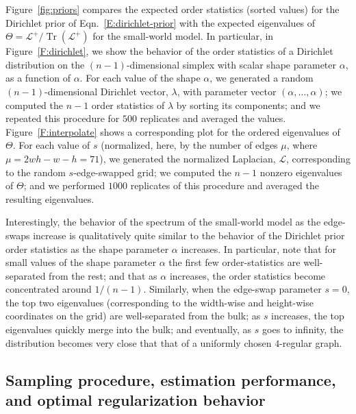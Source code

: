 \documentclass[12pt]{article}
\DeclareMathOperator*{\Tr}{Tr}
\theoremstyle{plain}
\begin{document}
Figure~\ref{fig:priors} compares the expected order statistics (sorted 
values) for the Dirichlet prior of Eqn.~\eqref{E:dirichlet-prior} with the 
expected eigenvalues of $\Theta  = \mathcal{L}^+ / \Tr(\mathcal{L}^+) $ for 
the small-world model.
In particular, in Figure~\ref{F:dirichlet}, we show the behavior of the 
order statistics of a Dirichlet distribution on the $(n-1)$-dimensional 
simplex with scalar shape parameter $\alpha$, as a function of $\alpha$.  
For each value of the shape $\alpha$, we generated a random 
$(n-1)$-dimensional Dirichlet vector, $\lambda$, with parameter vector 
$(\alpha, \dotsc, \alpha)$; we computed the $n-1$ order statistics of 
$\lambda$ by sorting its components; and we repeated this procedure for 
$500$ replicates and averaged the values.  
Figure~\ref{F:interpolate} shows a corresponding plot for the ordered 
eigenvalues of $\Theta$.
For each value of $s$ (normalized, here, by the number of edges $\mu$, 
where $\mu = 2 w h - w - h=71$), we generated the normalized Laplacian, 
$\mathcal{L}$, corresponding to the random $s$-edge-swapped grid; we 
computed the $n-1$ nonzero eigenvalues of $\Theta$; and we performed $1000$ 
replicates of this procedure and averaged the resulting eigenvalues. 

Interestingly, the behavior of the spectrum of the small-world model as
the edge-swaps increase is qualitatively quite similar to the behavior of 
the Dirichlet prior order statistics as the shape parameter $\alpha$ 
increases.
In particular, note that for small values of the shape parameter $\alpha$ 
the first few order-statistics are well-separated from the rest; and that 
as $\alpha$ increases, the order statistics become concentrated around 
$1/(n-1)$.
Similarly, when the edge-swap parameter $s = 0$, the top two eigenvalues 
(corresponding to the width-wise and height-wise coordinates on the grid) 
are well-separated from the bulk; as $s$ increases, the top eigenvalues 
quickly merge into the bulk; and eventually, as $s$ goes to infinity, the 
distribution becomes very close that that of a uniformly chosen $4$-regular 
graph.  


\vspace{-2mm}
\subsection{Sampling procedure, estimation performance, and optimal regularization behavior}
\label{S:estimation}
\end{document}
